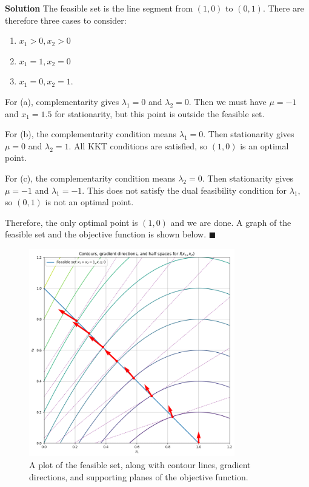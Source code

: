 \documentclass[11pt]{article}
\theoremstyle{problemstyle}
\newenvironment{solution}
  {\noindent\textbf{Solution}\quad}
  {\hfill$\blacksquare$\par\vspace{1em}}
\begin{document}
\begin{solution}
\noindent The feasible set is the line segment from $(1,0)$ to $(0,1)$. There are therefore three cases to consider:
\begin{enumerate}
  \item $x_1>0,x_2>0$\label{case:1}
  \item $x_1=1,x_2=0$\label{case:2}
  \item $x_1=0,x_2=1$.\label{case:3}
\end{enumerate}

\noindent For (a), complementarity gives $\lambda_1 = 0$ and $\lambda_2 = 0$. Then we must have $\mu = -1$ and $x_1 = 1.5$ for stationarity, but this point is outside the feasible set.

\noindent For (b), the complementarity condition means $\lambda_1 = 0$. Then stationarity gives $\mu = 0$ and $\lambda_2 = 1$. All KKT conditions are satisfied, so $(1,0)$
is an optimal point.

\noindent For (c), the complementarity condition means $\lambda_2 = 0$. Then stationarity gives $\mu = -1$ and $\lambda_1 = -1$.
This does not satisfy the dual feasibility condition for $\lambda_1$, so $(0,1)$ is not an optimal point.

\noindent Therefore, the only optimal point is $(1,0)$ and we are done. A graph of the feasible set and the objective function is shown below.
\end{solution}

\begin{figure}[h]
  \centering
  \includegraphics[width=0.8\textwidth]{contour_and_gradients.png}
  \caption{A plot of the feasible set, along with contour lines, gradient directions, and supporting planes of the objective function.}
  \label{fig:problem3}
\end{figure}
\end{document}
